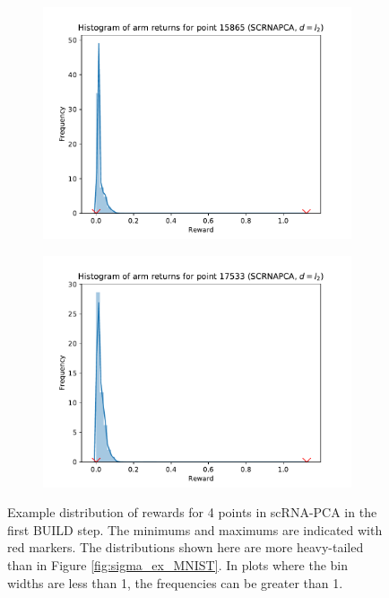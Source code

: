 \begin{figure}[ht]
\begin{subfigure}{.5\textwidth}
  \includegraphics[width=\linewidth]{figures/sigma-SCRNAPCA-2-L2.pdf}   
\end{subfigure}
\begin{subfigure}{.5\textwidth}
  \centering
  \includegraphics[width=\linewidth]{figures/sigma-SCRNAPCA-3-L2.pdf}   
\end{subfigure}
\caption{Example distribution of rewards for 4 points in scRNA-PCA in the first BUILD step. The minimums and maximums are indicated with red markers. The distributions shown here are more heavy-tailed than in Figure \ref{fig:sigma_ex_MNIST}. In plots where the bin widths are less than 1, the frequencies can be greater than 1.}
\label{fig:sigma_ex_SCRNAPCA}
\end{figure}


